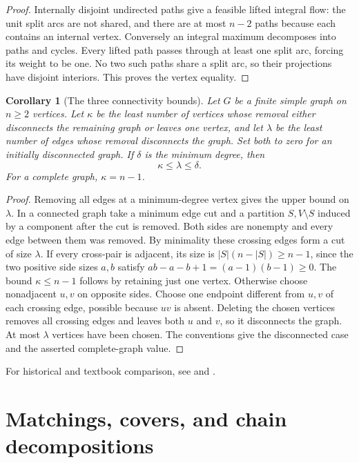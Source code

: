 \documentclass[11pt,oneside,openany]{book}
\theoremstyle{plain}
\newtheorem{corollary}[theorem]{Corollary}
\theoremstyle{definition}
\theoremstyle{remark}
\begin{document}
\begin{proof}
Internally disjoint undirected paths give a feasible lifted integral
flow: the unit split arcs are not shared, and there are at most
\(n-2\) paths because each contains an internal vertex. Conversely
an integral maximum decomposes into paths and cycles. Every lifted
path passes through at least one split arc, forcing its weight to
be one. No two such paths share a split arc, so their projections
have disjoint interiors. This proves the vertex equality.
\end{proof}

\begin{corollary}[The three connectivity bounds]
\label{p204:whitney}
Let \(G\) be a finite simple graph on \(n\geq2\) vertices. Let
\(\kappa\) be the least number of vertices whose removal either
disconnects the remaining graph or leaves one vertex, and let
\(\lambda\) be the least number of edges whose removal disconnects
the graph. Set both to zero for an initially disconnected graph.
If \(\delta\) is the minimum degree, then
\[
  \kappa\leq\lambda\leq\delta.
\]
For a complete graph, \(\kappa=n-1\).
\end{corollary}

\begin{proof}
Removing all edges at a minimum-degree vertex gives the upper
bound on \(\lambda\). In a connected graph take a minimum edge
cut and a partition \(S,V\setminus S\) induced by a component
after the cut is removed. Both sides are nonempty and every edge
between them was removed. By minimality these crossing edges
form a cut of size \(\lambda\). If every cross-pair is adjacent,
its size is \(|S|(n-|S|)\geq n-1\), since the two positive side
sizes \(a,b\) satisfy \(ab-a-b+1=(a-1)(b-1)\geq0\). The bound
\(\kappa\leq n-1\) follows by retaining just one vertex. Otherwise
choose nonadjacent \(u,v\) on opposite sides. Choose one endpoint
different from \(u,v\) of each crossing edge, possible because
\(uv\) is absent. Deleting the chosen vertices removes all crossing
edges and leaves both \(u\) and \(v\), so it disconnects the graph.
At most \(\lambda\) vertices have been chosen. The conventions give
the disconnected case and the asserted complete-graph value.
\end{proof}

For historical and textbook comparison, see \cite[Chapters 7 and 9]{BM}
and \cite[Chapters 10 and 15]{Schrijver}.
\chapter{Matchings, covers, and chain decompositions}
\label{p204:ch08}
\end{document}

